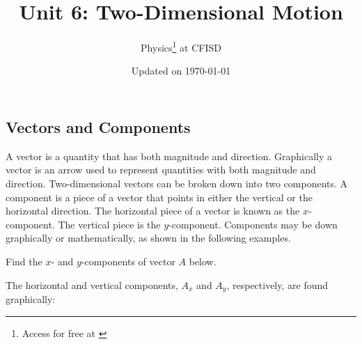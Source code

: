 \documentclass[dvipsnames]{article}
\title{Unit 6: Two-Dimensional Motion}
\author{Physics\footnote{Access for free at \href{\openstax}{\openstax}} \hspace{0.1ex} at CFISD}
\date{Updated on \today}
\numberwithin{equation}{section}
\numberwithin{figure}{section}
\begin{document}
\maketitle

\subsection{Vectors and Components}

A \gls{vector} is a quantity that has both magnitude and direction. Graphically a vector is an arrow used to represent quantities with both magnitude and direction. Two-dimensional vectors can be broken down into two components. A \gls{component} is a piece of a vector that points in either the vertical or the horizontal direction. The horizontal piece of a vector is known as the $x$-component. The vertical piece is the $y$-component. Components may be down graphically or mathematically, as shown in the following examples.

\begin{example}
    Find the $x$- and $y$-components of vector $A$ below.
\end{example}

\begin{center}
\def\Ax{6}
\def\Ay{4}
\end{center}

\clearpage
\Solution The horizontal and vertical components, $A_x$ and $A_y$, respectively, are found graphically:

\begin{center}
\def\Ax{6}
\def\Ay{4}
\end{center}
\end{document}
